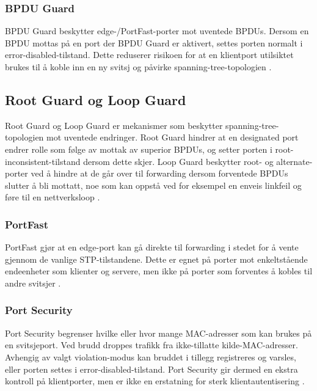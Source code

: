 \subsubsection{BPDU Guard}

BPDU Guard beskytter edge-/PortFast-porter mot uventede BPDUs. Dersom en BPDU mottas på en port der BPDU Guard er aktivert, settes porten normalt i error-disabled-tilstand. Dette reduserer risikoen for at en klientport utilsiktet brukes til å koble inn en ny svitsj og påvirke spanning-tree-topologien \cite{forsvaret_nettverk_rolle1}.

\subsection{Root Guard og Loop Guard}

Root Guard og Loop Guard er mekanismer som beskytter spanning-tree-topologien mot uventede endringer. Root Guard hindrer at en designated port endrer rolle som følge av mottak av superior BPDUs, og setter porten i root-inconsistent-tilstand dersom dette skjer. Loop Guard beskytter root- og alternate-porter ved å hindre at de går over til forwarding dersom forventede BPDUs slutter å bli mottatt, noe som kan oppstå ved for eksempel en enveis linkfeil og føre til en nettverksloop \cite{forsvaret_nettverk_rolle1, nsm_n03}.

\subsubsection{PortFast}

PortFast gjør at en edge-port kan gå direkte til forwarding i stedet for å vente gjennom de vanlige STP-tilstandene. Dette er egnet på porter mot enkeltstående endeenheter som klienter og servere, men ikke på porter som forventes å kobles til andre svitsjer \cite{forsvaret_nettverk_rolle1}.

\subsubsection{Port Security}

Port Security begrenser hvilke eller hvor mange MAC-adresser som kan brukes på en svitsjeport. Ved brudd droppes trafikk fra ikke-tillatte kilde-MAC-adresser. Avhengig av valgt violation-modus kan bruddet i tillegg registreres og varsles, eller porten settes i error-disabled-tilstand. Port Security gir dermed en ekstra kontroll på klientporter, men er ikke en erstatning for sterk klientautentisering \cite{forsvaret_nettverk_rolle1}.

